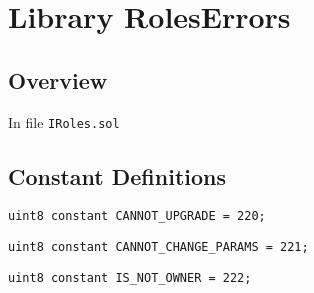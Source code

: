 
\chapter{Library RolesErrors}

\minitoc

\section{Overview}


In file {\tt IRoles.sol}

\section{Constant Definitions}


\begin{lstlisting}[firstnumber=6]
    uint8 constant CANNOT_UPGRADE = 220;
\end{lstlisting}

\begin{lstlisting}[firstnumber=7]
    uint8 constant CANNOT_CHANGE_PARAMS = 221;
\end{lstlisting}

\begin{lstlisting}[firstnumber=8]
    uint8 constant IS_NOT_OWNER = 222;
\end{lstlisting}
